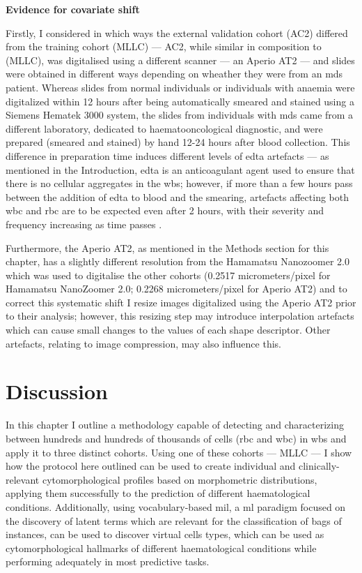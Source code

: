 \noindent \textbf{Evidence for covariate shift}

Firstly, I considered in which ways the external validation cohort (AC2) differed from the training cohort (MLLC) --- AC2, while similar in composition to (MLLC), was digitalised using a different scanner --- an Aperio AT2 --- and slides were obtained in different ways depending on wheather they were from an \ac{mds} patient. Whereas slides from normal individuals or individuals with anaemia were digitalized within 12 hours after being automatically smeared and stained using a Siemens Hematek 3000 system, the slides from individuals with \ac{mds} came from a different laboratory, dedicated to haematooncological diagnostic, and were prepared (smeared and stained) by hand 12-24 hours after blood collection. This difference in preparation time induces different levels of \ac{edta} artefacts --- as mentioned in the Introduction, \ac{edta} is an anticoagulant agent used to ensure that there is no cellular aggregates in the \ac{wbs}; however, if more than a few hours pass between the addition of \ac{edta} to blood and the smearing, artefacts affecting both \ac{wbc} and \ac{rbc} are to be expected even after 2 hours, with their severity and frequency increasing as time passes \cite{Bain2005-zg,Narasimha2008-fh}.

Furthermore, the Aperio AT2, as mentioned in the Methods section for this chapter, has a slightly different resolution from the Hamamatsu Nanozoomer 2.0 which was used to digitalise the other cohorts (0.2517 micrometers/pixel for Hamamatsu NanoZoomer 2.0; 0.2268 micrometers/pixel for Aperio AT2) and to correct this systematic shift I resize images digitalized using the Aperio AT2 prior to their analysis; however, this resizing step may introduce interpolation artefacts which can cause small changes to the values of each shape descriptor. Other artefacts, relating to image compression, may also influence this. 

\FloatBarrier

\section{Discussion}

In this chapter I outline a methodology capable of detecting and characterizing between hundreds and hundreds of thousands of cells (\ac{rbc} and \ac{wbc}) in \ac{wbs} and apply it to three distinct cohorts. Using one of these cohorts --- MLLC --- I show how the protocol here outlined can be used to create individual and clinically-relevant cytomorphological profiles based on morphometric distributions, applying them successfully to the prediction of different haematological conditions. Additionally, using vocabulary-based \ac{mil}, a \ac{ml} paradigm focused on the discovery of latent terms which are relevant for the classification of bags of instances, can be used to discover virtual cells types, which can be used as cytomorphological hallmarks of different haematological conditions while performing adequately in most predictive tasks.

